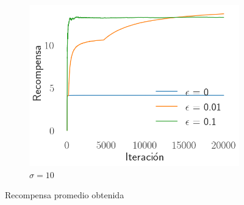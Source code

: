 \documentclass[12pt]{article}
\begin{document}
\begin{figure}[H]
\begin{subfigure}[H]{0.3\textwidth}
            \includegraphics[width=\textwidth]{../img/20000/reward_iteration_sigma_10}
            \caption{$\sigma=10$}
            \label{fig:average_reward_10}
        \end{subfigure}
        \caption{Recompensa promedio obtenida}
        \label{fig:average_reward}
    \end{figure}
\end{document}
